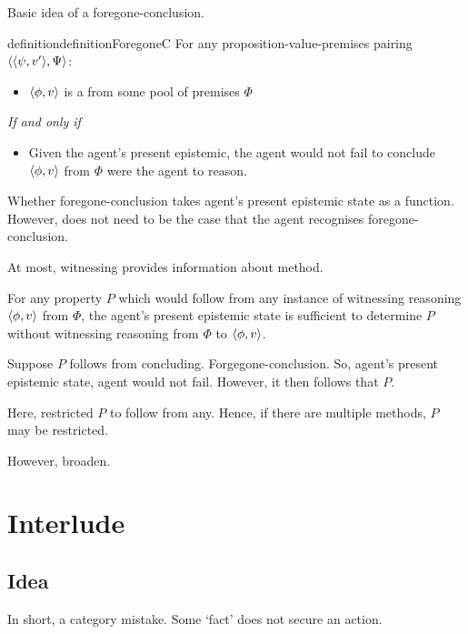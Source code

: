 \begin{note}
  Basic idea of a foregone-conclusion.

  \begin{restatable}{definition}{definitionForegoneC}
    For any proposition-value-premises pairing \(\langle \langle \psi, v' \rangle, \Psi \rangle\):
    \begin{itemize}
    \item
      \(\langle \phi, v \rangle\) is a \emph{} from some pool of premises \(\Phi\)
    \end{itemize}
    \emph{If and only if}
    \begin{itemize}
    \item
      Given the agent's present epistemic, the agent would not fail to conclude \(\langle \phi, v \rangle\) from \(\Phi\) were the agent to reason.
    \end{itemize}
  \end{restatable}

  Whether foregone-conclusion takes agent's present epistemic state as a function.
  However, does not need to be the case that the agent recognises foregone-conclusion.

  At most, witnessing provides information about method.

  For any property \(P\) which would follow from any instance of witnessing reasoning \(\langle \phi, v \rangle\) from \(\Phi\), the agent's present epistemic state is sufficient to determine \(P\) without witnessing reasoning from \(\Phi\) to \(\langle \phi, v \rangle\).

  Suppose \(P\) follows from concluding.
  Forgegone-conclusion.
  So, agent's present epistemic state, agent would not fail.
  However, it then follows that \(P\).

  Here, restricted \(P\) to follow from any.
  Hence, if there are multiple methods, \(P\) may be restricted.

  However, broaden.
\end{note}


\section{Interlude}
\label{cha:fcs:sec:interlude}

\subsection{Idea}

\begin{note}
  In short, a category mistake.
  Some `fact' does not secure an action.
\end{note}

